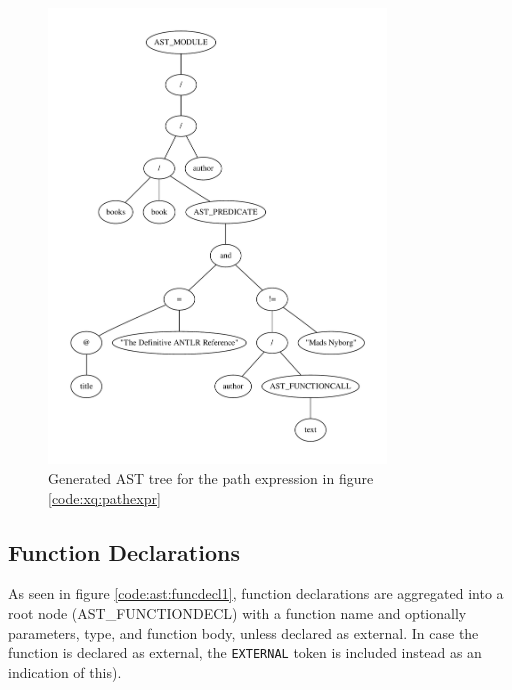 \pagebreak
\begin{figure}[h!]

\caption{Path expression example, generates AST seen in figure \ref{tree:ast:pathexpr}}
\label{code:xq:pathexpr}
\centering
 \includegraphics[width=0.8\textwidth]{img/graphs/pathexpr}
\caption{Generated AST tree for the path expression in figure 
\ref{code:xq:pathexpr}}
\label{tree:ast:pathexpr}
\end{figure}

\subsection{Function Declarations}

As seen in figure \ref{code:ast:funcdecl1}, function declarations are aggregated
into a root node (AST\_FUNCTIONDECL) with a function name and optionally
parameters, type, and function body, unless declared as external. In case the
function is declared as external, the \verb!EXTERNAL! token is included instead
as an indication of this).

